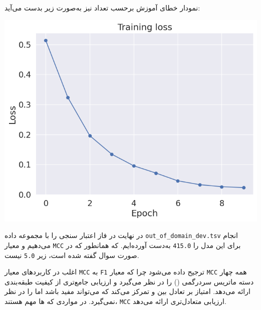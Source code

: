 \begin{qsolve}
	نمودار خطای آموزش برحسب تعداد  نیز به‌صورت زیر بدست می‌آید:
	
	\begin{center}
		\includegraphics*[width=0.7\linewidth]{pics/img15.png}
		\label{نمودار خطای آموزش}
	\end{center}
	
	در نهایت در فاز اعتبار سنجی را با مجموعه داده \texttt{out\_of\_domain\_dev.tsv}
	انجام می‌دهیم و معیار \texttt{MCC} برای این مدل را \texttt{415.0} به‌دست آورده‌ایم. که همانطور که در صورت سوال گفته شده است، زیر \texttt{5.0} نیست.
	
	اغلب در کاربرد‌های  معیار \texttt{MCC} به \texttt{F1} ترجیح داده می‌شود چرا که معیار \texttt{MCC} همه چهار دسته ماتریس سردرگمی () را در نظر می‌گیرد و ارزیابی جامع‌تری از کیفیت طبقه‌بندی ارائه می‌دهد.
	امتیاز  بر تعادل بین  و  تمرکز می‌کند که می‌تواند مفید باشد اما  را در نظر نمی‌گیرد. در مواردی که  ها مهم هستند، \texttt{MCC} ارزیابی متعادل‌تری ارائه می‌دهد.
\end{qsolve}